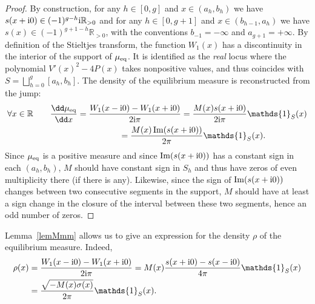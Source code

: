 \documentclass[10pt,a4paper]{amsart}
\numberwithin{equation}{section}
\newcommand{\ind}{\mathds{1}}
\begin{document}
\begin{proof}
By construction, for any $h \in [0,g]$ and $x \in (a_h,b_h)$ we have $s(x + {\rm i}0) \in (-1)^{g -h}{\rm i}\mathbb{R}_{> 0}$ and for any $h \in [0,g + 1]$ and $x \in (b_{h - 1},a_h)$ we have $s(x) \in (-1)^{g + 1 - h}\mathbb{R}_{> 0}$, with the conventions $b_{-1} = -\infty$ and $a_{g + 1} = +\infty$. By definition of the Stieltjes transform, the function $W_1(x)$ has a discontinuity in the interior of the support of $\mu_{{\rm eq}}$. It is identified as the \emph{real} locus where the polynomial $V'(x)^2 - 4P(x)$ takes nonpositive values, and thus coincides with $S = \bigsqcup_{h = 0}^{g} [a_h,b_h]$. The density of the equilibrium measure is reconstructed from the jump:
\begin{gather*}
\forall x \in \mathbb{R} \qquad \frac{\dd\mu_{{\rm eq}}}{\dd x} = \frac{W_1(x - {\rm i}0) - W_1(x + {\rm i}0)}{2{\rm i} \pi} = \frac{M(x)s(x + {\rm i}0)}{2{\rm i}\pi}\ind_{S}(x) \\
\hphantom{\forall x \in \mathbb{R}\qquad \frac{\dd\mu_{{\rm eq}}}{\dd x}}{}
 = \frac{M(x) \operatorname{Im}(s(x + {\rm i}0))}{2\pi}\ind_S(x).
\end{gather*}
Since $\mu_{{\rm eq}}$ is a positive measure and since $\operatorname{Im}(s(x + {\rm i}0))$ has a constant sign in each $(a_h,b_h)$, $M$ should have constant sign in $S_h$ and thus have zeros of even multiplicity there (if there is any). Likewise, since the sign of $\operatorname{Im}(s(x + {\rm i}0))$ changes between two consecutive segments in the support, $M$ should have at least a sign change in the closure of the interval between these two segments, hence an odd number of zeros.
\end{proof}

Lemma~\ref{lemMmm} allows us to give an expression for the
density $\rho$ of the equilibrium measure. Indeed,
\begin{align*}%
 \rho(x) & = \frac{W_{1}(x -{\rm i}0) - W_{1}(x + {\rm i}0)}{2{\rm i}\pi} = M(x)\frac{s(x+{\rm i}0)-s(x-{\rm i}0)}{4\pi}\ind_{S}(x) \\
 & = \frac{\sqrt{-M(x)\sigma(x)}}{2\pi}\ind_{S}(x).
\end{align*}
\end{document}
